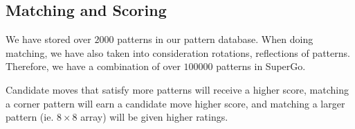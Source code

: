 \subsection{Matching and Scoring}

We have stored over $2000$ patterns in our pattern database. When doing matching, we have also taken into consideration rotations, reflections of patterns. Therefore, we have a combination of over $100000$ patterns in SuperGo.

Candidate moves that satisfy more patterns will receive a higher score, matching a corner pattern will earn a candidate move higher score, and matching a larger pattern (ie. $8 \times 8$ array) will be given higher ratings.
